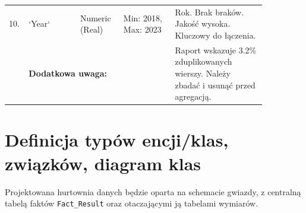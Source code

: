 \documentclass[a4paper,12pt]{article}
\begin{document}
\begin{longtable}{|p{0.03\linewidth}|p{0.18\linewidth}|p{0.15\linewidth}|p{0.18\linewidth}|p{0.32\linewidth}|}
  \tiny 10.         & \tiny `Year`                                         & \tiny Numeric (Real)                                                                        & \tiny Min: 2018, Max: 2023    & \tiny Rok. Brak braków. Jakość wysoka. Kluczowy do łączenia.                                                       \\
  \tiny             & \multicolumn{3}{l|}{\tiny \textbf{Dodatkowa uwaga:}} & \tiny Raport wskazuje 3.2\% zduplikowanych wierszy. Należy zbadać i usunąć przed agregacją.                                                                                                                                                      \\
\end{longtable}

\section{Definicja typów encji/klas, związków, diagram klas}
\label{sec:definicja_encji_final}
Projektowana hurtownia danych będzie oparta na schemacie gwiazdy, z centralną tabelą faktów \texttt{Fact\_Result} oraz otaczającymi ją tabelami wymiarów.
\end{document}
